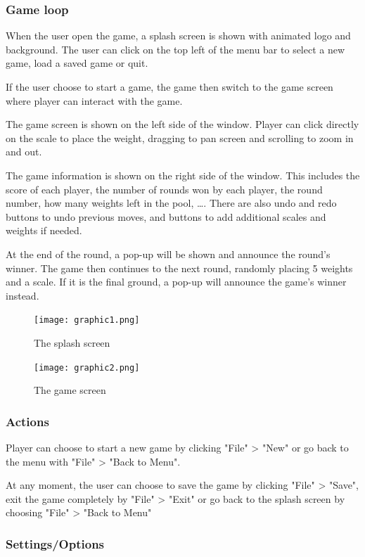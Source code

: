 \documentclass[12pt]{article}
\begin{document}
\subsubsection{Game loop}

When the user open the game, a splash screen is shown with animated logo and
background. The user can click on the top left of the menu bar to select a new
game, load a saved game or quit.

If the user choose to start a game, the game then switch to the game screen where player can interact with the game. 

The game screen is shown on the left side of the window. Player can click
directly on the scale to place the weight, dragging to pan screen and scrolling
to zoom in and out.

The game information is shown on the right side of the window. This includes the
score of each player, the number of rounds won by each player, the round number,
how many weights left in the pool, \dots. There are also undo and redo buttons
to undo previous moves, and buttons to add additional scales and weights if
needed.


At the end of the round, a pop-up will be shown and announce the round's winner.
The game then continues to the next round, randomly placing 5 weights and a
scale. If it is the final ground, a pop-up will announce the game's winner
instead.

\begin{figure}
  \centering
  \caption{The splash screen}
  \texttt{[image: graphic1.png]}
  \label{fig:gra1}
\end{figure}
\begin{figure}
  \centering
  \caption{The game screen}
  \texttt{[image: graphic2.png]}
  \label{fig:gra2}
\end{figure}
\subsubsection{Actions}

Player can choose to start a new game by clicking "File" > "New" or go back to
the menu with "File" > "Back to Menu".

At any moment, the user can choose to save the game by clicking "File" > "Save",
exit the game completely by "File" > "Exit" or go back to the splash screen by choosing "File" >
"Back to Menu"

\subsubsection{Settings/Options}
\end{document}
